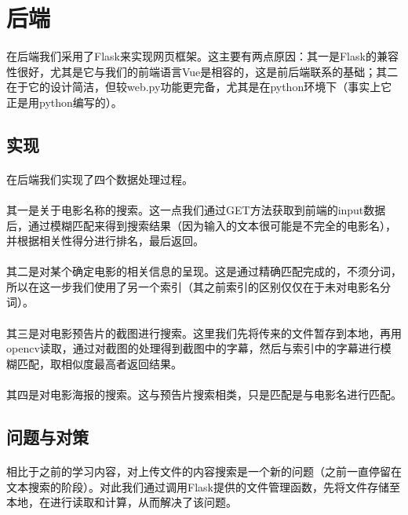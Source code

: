 \documentclass[main.tex]{subfiles}
\begin{document}
\section{后端}
\paragraph{} 在后端我们采用了Flask来实现网页框架。这主要有两点原因：其一是Flask的兼容性很好，尤其是它与我们的前端语言Vue是相容的，这是前后端联系的基础；其二在于它的设计简洁，但较web.py功能更完备，尤其是在python环境下（事实上它正是用python编写的）。
\subsection{实现}
\paragraph{} 在后端我们实现了四个数据处理过程。
\paragraph{} 其一是关于电影名称的搜索。这一点我们通过GET方法获取到前端的input数据后，通过模糊匹配来得到搜索结果（因为输入的文本很可能是不完全的电影名），并根据相关性得分进行排名，最后返回。
\paragraph{} 其二是对某个确定电影的相关信息的呈现。这是通过精确匹配完成的，不须分词，所以在这一步我们使用了另一个索引（其之前索引的区别仅仅在于未对电影名分词）。
\paragraph{} 其三是对电影预告片的截图进行搜索。这里我们先将传来的文件暂存到本地，再用opencv读取，通过对截图的处理得到截图中的字幕，然后与索引中的字幕进行模糊匹配，取相似度最高者返回结果。
\paragraph{} 其四是对电影海报的搜索。这与预告片搜索相类，只是匹配是与电影名进行匹配。
\subsection{问题与对策}
\paragraph{} 相比于之前的学习内容，对上传文件的内容搜索是一个新的问题（之前一直停留在文本搜索的阶段）。对此我们通过调用Flask提供的文件管理函数，先将文件存储至本地，在进行读取和计算，从而解决了该问题。
\end{document}
